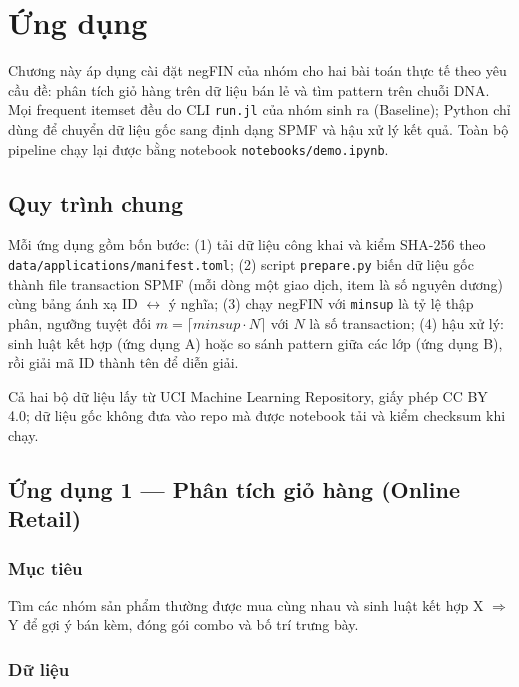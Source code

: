 \section{Ứng dụng}\label{sec:ch3}

Chương này áp dụng cài đặt negFIN của nhóm \cite{negfin} cho hai bài toán thực tế theo yêu cầu đề: phân tích giỏ hàng trên dữ liệu bán lẻ và tìm pattern trên chuỗi DNA. Mọi frequent itemset đều do CLI \texttt{run.jl} của nhóm sinh ra (Baseline); Python chỉ dùng để chuyển dữ liệu gốc sang định dạng SPMF và hậu xử lý kết quả. Toàn bộ pipeline chạy lại được bằng notebook \nolinkurl{notebooks/demo.ipynb}.

\subsection{Quy trình chung}

Mỗi ứng dụng gồm bốn bước: (1) tải dữ liệu công khai và kiểm SHA-256 theo \nolinkurl{data/applications/manifest.toml}; (2) script \texttt{prepare.py} biến dữ liệu gốc thành file transaction SPMF (mỗi dòng một giao dịch, item là số nguyên dương) cùng bảng ánh xạ ID $\leftrightarrow$ ý nghĩa; (3) chạy negFIN với \texttt{minsup} là tỷ lệ thập phân, ngưỡng tuyệt đối \(m = \lceil \mathit{minsup}\cdot N\rceil\) với \(N\) là số transaction; (4) hậu xử lý: sinh luật kết hợp (ứng dụng A) hoặc so sánh pattern giữa các lớp (ứng dụng B), rồi giải mã ID thành tên để diễn giải.

Cả hai bộ dữ liệu lấy từ UCI Machine Learning Repository, giấy phép CC BY 4.0; dữ liệu gốc không đưa vào repo mà được notebook tải và kiểm checksum khi chạy.

\subsection{Ứng dụng 1 --- Phân tích giỏ hàng (Online Retail)}

\subsubsection{Mục tiêu}

Tìm các nhóm sản phẩm thường được mua cùng nhau và sinh luật kết hợp X $\Rightarrow$ Y để gợi ý bán kèm, đóng gói combo và bố trí trưng bày.

\subsubsection{Dữ liệu}

